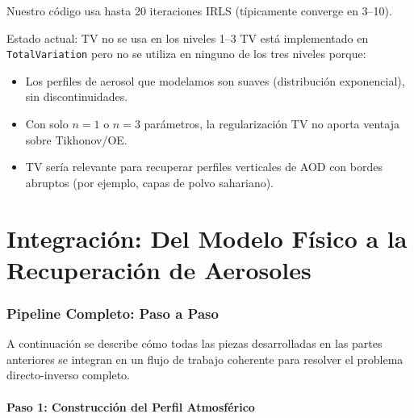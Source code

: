 \documentclass[a4paper,11pt]{article}
\begin{document}
Nuestro c\'odigo usa hasta 20 iteraciones IRLS (t\'ipicamente converge en
3--10).

\begin{concept}{Estado actual: TV no se usa en los niveles 1--3}
TV est\'a implementado en \texttt{TotalVariation} pero no se utiliza en
ninguno de los tres niveles porque:
\begin{itemize}
    \item Los perfiles de aerosol que modelamos son suaves (distribuci\'on
          exponencial), sin discontinuidades.
    \item Con solo $n = 1$ o $n = 3$ par\'ametros, la regularizaci\'on TV no
          aporta ventaja sobre Tikhonov/OE.
    \item TV ser\'ia relevante para recuperar perfiles verticales de AOD con
          bordes abruptos (por ejemplo, capas de polvo sahariano).
\end{itemize}
\end{concept}


\part{Integraci\'on: Del Modelo F\'isico a la Recuperaci\'on de Aerosoles}

\section{Pipeline Completo: Paso a Paso}

A continuaci\'on se describe c\'omo todas las piezas desarrolladas en las
partes anteriores se integran en un flujo de trabajo coherente para resolver
el problema directo-inverso completo.

\subsection{Paso 1: Construcci\'on del Perfil Atmosf\'erico}
\end{document}
